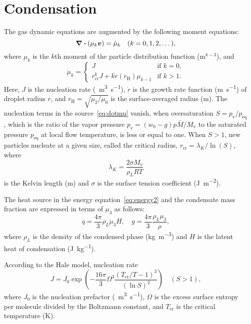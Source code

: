 \documentclass{article}
\newcommand{\vap}{\text{v}}
\newcommand{\eq}{\text{eq}}
\newcommand{\crit}[2][]{#2_\text{cr#1}}
\newcommand{\Hill}{\text{H}}
\newcommand{\bv}{\vb*{v}}
\begin{document}
\section{Condensation}

The gas dynamic equations are augmented by the following moment equations:
\begin{equation}\label{eq:mu_k}
    \div(\mu_k\bv) = \dot{\mu}_k \quad (k=0,1,2,\dots),
\end{equation}
where $\mu_k$ is the $k$th moment of the particle distribution function ($\si{\m}^{k-3}$), and
\begin{equation}\label{eq:dotmu}
    \dot\mu_k = \begin{cases}
        J &\text{if } k=0,\\
        \crit{r}^{k}J + k\dot{r}(r_\Hill)\mu_{k-1} &\text{if } k>1.
    \end{cases}
\end{equation}
Here, $J$ is the nucleation rate (\si{\per\cubic\m\per\s}),
$\dot{r}$ is the growth rate function (\si{\m\per\s}) of droplet radius $r$,
and $r_\Hill=\sqrt{\mu_2/\mu_0}$ is the surface-averaged radius (\si{\m}).
The nucleation terms in the source~\eqref{eq:dotmu} vanish, when oversaturation $S = p_\vap/p_\eq$,
which is the ratio of the vapor pressure $p_\vap = (w_0 - g)p\bar{M}/M_\vap$
to the saturated pressure $p_\eq$ at local flow temperature, is less or equal to one.
When $S>1$, new particles nucleate at a given size,
called the critical radius, $\crit{r} = \lambda_K/\ln(S)$, where
\begin{equation}\label{eq:Kelvin}
    \lambda_K = \frac{2\sigma M_\vap}{\rho_L R T}
\end{equation}
is the Kelvin length (\si{m}) and $\sigma$ is the surface tension coefficient (\si{\J\per\square\m}).

The heat source in the energy equation~\eqref{eq:energy2}
and the condensate mass fraction are expressed in terms of $\mu_3$ as follows:
\begin{equation}\label{eq:dotq-g}
     \dot{q} = \frac{4\pi}{3}\rho_L\dot{\mu}_3H, \quad g = \frac{4\pi}{3} \frac{\rho_L\mu_3}{\rho},
\end{equation}
where $\rho_L$ is the density of the condensed phase (\si{\kg\per\cubic\m})
and $H$ is the latent heat of condensation (\si{\J\per\kg}).

According to the Hale model, nucleation rate
\begin{equation}\label{eq:J}
    J = J_{0} \exp(-\frac{16\pi}{3}\Omega^3 \frac{(\crit{T}/T-1)^3}{(\ln S)^2}) \quad (S > 1),
\end{equation}
where $J_0$ is the nucleation prefactor (\si{\per\cubic\m\per\s}),
$\Omega$ is the excess surface entropy per molecule divided by the Boltzmann constant,
and $\crit{T}$ is the critical temperature (\si{\K}).
\end{document}
